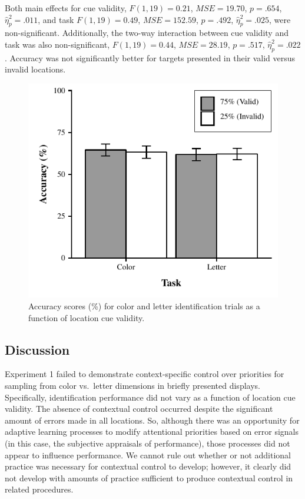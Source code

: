\documentclass[english,,man,floatsintext]{apa6}
\begin{document}
Both main effects for cue validity, \(F(1, 19) = 0.21\),
\(\mathit{MSE} = 19.70\), \(p = .654\), \(\hat{\eta}^2_p = .011\), and
task \(F(1, 19) = 0.49\), \(\mathit{MSE} = 152.59\), \(p = .492\),
\(\hat{\eta}^2_p = .025\), were non-significant. Additionally, the
two-way interaction between cue validity and task was also
non-significant, \(F(1, 19) = 0.44\), \(\mathit{MSE} = 28.19\),
\(p = .517\), \(\hat{\eta}^2_p = .022\). Accuracy was not significantly
better for targets presented in their valid versus invalid locations.

\begin{figure}
\centering
\includegraphics{figures/IC-figure2.pdf}
\caption{\label{fig:figure2}Accuracy scores (\%) for color and letter identification
trials as a function of location cue validity.}
\end{figure}




\subsection{Discussion}\label{discussion}

Experiment 1 failed to demonstrate context-specific control over
priorities for sampling from color vs.~letter dimensions in briefly
presented displays. Specifically, identification performance did not
vary as a function of location cue validity. The absence of contextual
control occurred despite the significant amount of errors made in all
locations. So, although there was an opportunity for adaptive learning
processes to modify attentional priorities based on error signals (in
this case, the subjective appraisals of performance), those processes
did not appear to influence performance. We cannot rule out whether or
not additional practice was necessary for contextual control to develop;
however, it clearly did not develop with amounts of practice sufficient
to produce contextual control in related procedures.
\end{document}
